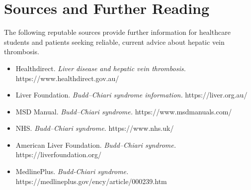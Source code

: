 \section*{Sources and Further Reading}
The following reputable sources provide further information for healthcare students and patients seeking reliable, current advice about hepatic vein thrombosis.

\begin{itemize}
    \item Healthdirect. \textit{Liver disease and hepatic vein thrombosis.} https://www.healthdirect.gov.au/
    \item Liver Foundation. \textit{Budd--Chiari syndrome information.} https://liver.org.au/
    \item MSD Manual. \textit{Budd--Chiari syndrome.} https://www.msdmanuals.com/
    \item NHS. \textit{Budd--Chiari syndrome.} https://www.nhs.uk/
    \item American Liver Foundation. \textit{Budd--Chiari syndrome.} https://liverfoundation.org/
    \item MedlinePlus. \textit{Budd-Chiari syndrome.} https://medlineplus.gov/ency/article/000239.htm
\end{itemize}
